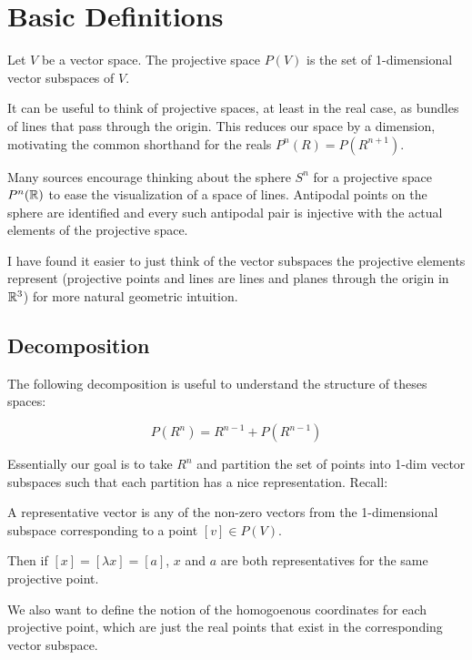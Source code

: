 \documentclass[10pt]{article}
\begin{document}
\section{Basic Definitions}

\begin{definition}
	Let $V$ be a vector space. The projective space $P(V)$ is the set of 1-dimensional vector subspaces of $V$.
\end{definition}

It can be useful to think of projective spaces, at least in the real case, as
bundles of lines that pass through the origin. This reduces our space by a
dimension, motivating the common shorthand for the reals $P^n(R) = P(R^{n+1})$. 

Many sources encourage thinking about the sphere $S^n$ for a projective space
$P^n(\mathbb{R})$ to ease the visualization of a space of lines. Antipodal points on
the sphere are identified and every such antipodal pair is injective with the
actual elements of the projective space. 

I have found it easier to just think of the vector subspaces the projective
elements represent (projective points and lines are lines and planes through the
origin in $\mathbb{R}^3$) for more natural geometric intuition.

\subsection{Decomposition}

The following decomposition is useful to understand the structure of theses spaces:

\[P(R^n) = R^{n-1} + P(R^{n-1}) \]

Essentially our goal is to take $R^n$ and partition the set of points into
1-dim vector subspaces such that each partition has a nice representation.
Recall:

\begin{definition}
	A representative vector is any of the non-zero vectors from the 1-dimensional subspace corresponding to a point $[v] \in P(V)$.
\end{definition}

Then if $[x] = [\lambda x] = [a]$, $x$ and $a$ are both representatives for the same projective point.

We also want to define the notion of the homogoenous coordinates for each
projective point, which are just the real points that exist in the
corresponding vector subspace.
\end{document}
